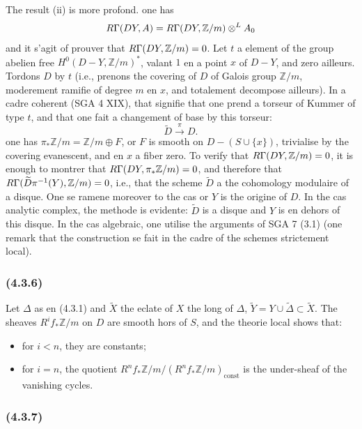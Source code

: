 \documentclass[12pt,a4paper]{article}
\theoremstyle{plain}
\theoremstyle{definition}
\theoremstyle{remark}
\newcommand{\const}{\text{const}}
\let\mod\relax
\DeclareMathOperator{\mod}{mod}
\newcommand{\bbZ}{\mathbb{Z}}
\begin{document}
The result (ii) is more profond. one has
\[
R\Gamma(D \mod Y, A) = R\Gamma(D \mod Y, \bbZ/m) \otimes^L A_0
\]
and it s'agit of prouver that $R\Gamma(D \mod Y, \bbZ/m) = 0$. Let $t$ a element of the group abelien free $H^0(D - Y, \bbZ/m)^*$, valant $1$ en a point $x$ of $D - Y$, and zero ailleurs. Tordons $D$ by $t$ (i.e., prenons the covering of $D$ of Galois group $\bbZ/m$, moderement ramifie of degree $m$ en $x$, and totalement decompose ailleurs). In a cadre coherent (SGA 4 XIX), that signifie that one prend a torseur of Kummer of type $t$, and that one fait a changement of base by this torseur:
\[
\widetilde{D} \xrightarrow{\pi} D.
\]
one has $\pi_*\bbZ/m = \bbZ/m \oplus F$, or $F$ is smooth on $D - (S \cup \{x\})$, trivialise by the covering evanescent, and en $x$ a fiber zero. To verify that $R\Gamma(D \mod Y, \bbZ/m) = 0$, it is enough to montrer that $R\Gamma(D \mod Y, \pi_*\bbZ/m) = 0$, and therefore that $R\Gamma(\widetilde{D} \mod \pi^{-1}(Y), \bbZ/m) = 0$, i.e., that the scheme $\widetilde{D}$ a the cohomology modulaire of a disque. One se ramene moreover to the cas or $Y$ is the origine of $D$. In the cas analytic complex, the methode is evidente: $\widetilde{D}$ is a disque and $Y$ is en dehors of this disque. In the cas algebraic, one utilise the arguments of SGA 7 (3.1) (one remark that the construction se fait in the cadre of the schemes strictement local).

\subsubsection*{\textup{(4.3.6)}}

Let $\Delta$ as en (4.3.1) and $\widetilde{X}$ the eclate of $X$ the long of $\Delta$, $\widetilde{Y} = Y \cup \widetilde{\Delta} \subset \widetilde{X}$. The sheaves $R^i f_* \bbZ/m$ on $D$ are smooth hors of $S$, and the theorie local shows that:
\begin{itemize}
\item[(i)] for $i < n$, they are constants;
\item[(ii)] for $i = n$, the quotient $R^n f_* \bbZ/m / (R^n f_* \bbZ/m)_{\const}$ is the under-sheaf of the vanishing cycles.
\end{itemize}

\subsubsection*{\textup{(4.3.7)}}
\end{document}
